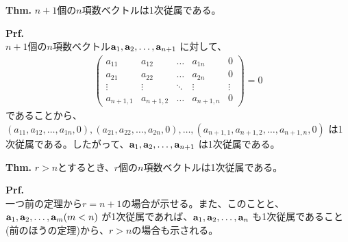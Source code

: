 \documentclass[a4paper,11pt]{jsarticle}
\numberwithin{equation}{section}
\begin{document}
\begin{itembox}[l]{\textbf{Thm.}}
  $n+1$個の$n$項数ベクトルは1次従属である。
\end{itembox}
\textbf{Prf.}\\
$n+1$個の$n$項数ベクトル$\vb{a}_1, \vb{a}_2, \dots, \vb{a}_{n+1}$ に対して、
\begin{align}
  \begin{pmatrix}
    a_{11} & a_{12} & \dots & a_{1n} & 0\\
    a_{21} & a_{22} & \dots & a_{2n} & 0\\
    \vdots & \vdots & \ddots & \vdots & \vdots\\
    a_{n+1,1} & a_{n+1,2} & \dots & a_{n+1,n} & 0
  \end{pmatrix}
  = 0
\end{align}
であることから、$(a_{11}, a_{12}, \dots, a_{1n}, 0), (a_{21}, a_{22}, \dots, a_{2n}, 0), \dots, (a_{n+1,1}, a_{n+1,2}, \dots, a_{n+1,n}, 0)$ は1次従属である。したがって、$\vb{a}_1, \vb{a}_2, \dots, \vb{a}_{n+1}$ は1次従属である。\hfill\qedsymbol\\

\begin{itembox}[l]{\textbf{Thm.}}
  $r>n$とするとき、$r$個の$n$項数ベクトルは1次従属である。
\end{itembox}
\textbf{Prf.}\\
一つ前の定理から$r=n+1$の場合が示せる。また、このことと、$\vb{a}_1, \vb{a}_2, \dots, \vb{a}_m (m < n)$ が1次従属であれば、$\vb{a}_1, \vb{a}_2, \dots, \vb{a}_n$ も1次従属であること(前のほうの定理)から、$r>n$の場合も示される。\hfill\qedsymbol\\
\end{document}
